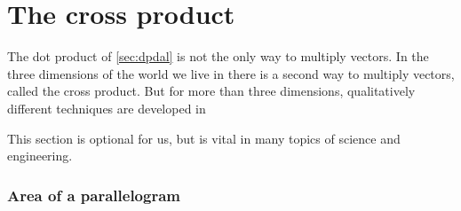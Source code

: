 \section{The cross product}
\label{sec:cp}



The dot product of \cref{sec:dpdal} is not the only way to multiply vectors.
In the three dimensions of the world we live in there is a second way to multiply vectors, called the cross product.
But for more than three dimensions, qualitatively different techniques are developed in 

This section is optional for us, 
but is vital in many topics of science and engineering.



\subsubsection{Area of a parallelogram}

